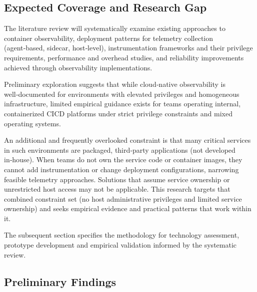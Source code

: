 \documentclass[12pt]{article}
\begin{document}
\subsection{Expected Coverage and Research Gap}

The literature review will systematically examine existing approaches to container observability, deployment patterns for telemetry collection (agent‑based, sidecar, host‑level), instrumentation frameworks and their privilege requirements, performance and overhead studies, and reliability improvements achieved through observability implementations.

Preliminary exploration suggests that while cloud‑native observability is well‑documented for environments with elevated privileges and homogeneous infrastructure, limited empirical guidance exists for teams operating internal, containerized \ac{CICD} platforms under strict privilege constraints and mixed operating systems.

An additional and frequently overlooked constraint is that many critical services in such environments are packaged, third‑party applications (not developed in‑house). When teams do not own the service code or container images, they cannot add instrumentation or change deployment configurations, narrowing feasible telemetry approaches. Solutions that assume service ownership or unrestricted host access may not be applicable. This research targets that combined constraint set (no host administrative privileges and limited service ownership) and seeks empirical evidence and practical patterns that work within it.

The subsequent section specifies the methodology for technology assessment, prototype development and empirical validation informed by the systematic review.

\subsection{Preliminary Findings}
\end{document}
